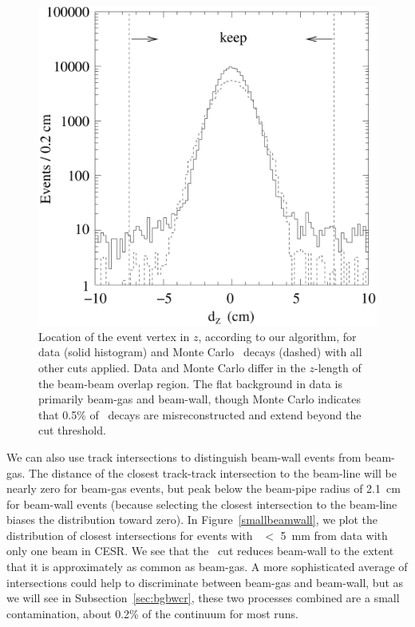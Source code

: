 \documentclass{cornell}
\begin{document}
\begin{figure}[p]
  \begin{center}
    \includegraphics[width=\linewidth]{plots/dz}
  \end{center}
  \caption{\label{dz} Location of the event vertex in $z$, according
  to our algorithm, for data (solid histogram) and Monte Carlo \ups\
  decays (dashed) with all other cuts applied.  Data and Monte Carlo
  differ in the $z$-length of the beam-beam overlap region.  The flat
  background in data is primarily beam-gas and beam-wall, though Monte
  Carlo indicates that 0.5\% of \ups\ decays are misreconstructed and
  extend beyond the cut threshold.}
\end{figure}

We can also use track intersections to distinguish beam-wall events
from beam-gas.  The distance of the closest track-track intersection
to the beam-line will be nearly zero for beam-gas events, but peak
below the beam-pipe radius of 2.1~cm for beam-wall events (because
selecting the closest intersection to the beam-line biases the
distribution toward zero).  In Figure~\ref{smallbeamwall}, we plot the
distribution of closest intersections for events with \dxy\ $<$ 5~mm
from data with only one beam in CESR.  We see that the \dxy\ cut
reduces beam-wall to the extent that it is approximately as common as
beam-gas.  A more sophisticated average of intersections could help to
discriminate between beam-gas and beam-wall, but as we will see in
Subsection~\ref{sec:bgbwcr}, these two processes combined are a small
contamination, about 0.2\% of the continuum for most runs.
\end{document}
